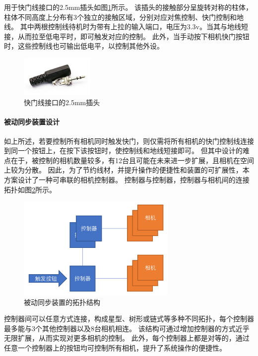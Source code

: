用于快门线接口的2.5mm插头如图\ref{fig:2.5mm}所示。
该插头的接触部分呈旋转对称的柱体，柱体不同高度上分布有3个独立的接触区域，分别对应对焦控制、快门控制和地线。
其中两根控制线待机时为带有上拉的输入端口，电压为3.3v。当其与地线短接，从而拉至低电平时，即可触发对应的控制。
此外，当手动按下相机快门按钮时，这些控制线也可输出低电平，以控制其他外设。

\begin{figure}
\centering
\includegraphics[height=2cm]{figures/2.5mm}
\caption{快门线接口的2.5mm插头}
\label{fig:2.5mm}
\end{figure}

\paragraph{被动同步装置设计}
如上所述，若要控制所有相机同时触发快门，则仅需将所有相机的快门控制线连接到同一个按钮上，在按下该按钮时，使控制线和地线短接即可。
但其中设计的难点在于，被控制的相机数量较多，有12台且可能在未来进一步扩展，且相机在空间上较为分散。
因此，为了节约线材，并提升操作的便捷性和装置的可扩展性，本方案设计了一种可串联的相机控制器。
控制器与控制器，控制器与相机间的连接拓扑如图\ref{fig:passive_sync_topo}所示。
\begin{figure}
\centering
\includegraphics[height=5cm]{figures/passive_sync_topo}
\caption{被动同步装置的拓扑结构}
\label{fig:passive_sync_topo}
\end{figure}
控制器间可以任意方式连接，构成星型、树形或链式等多种不同拓扑，每个控制器最多能与3个其他控制器以及8台相机相连。
该结构可通过增加控制器的方式近乎无限扩展，从而实现对更多相机的控制。
此外，每个控制器上都是对等的，通过任意一个控制器上的按钮均可控制所有相机，提升了系统操作的便捷性。


